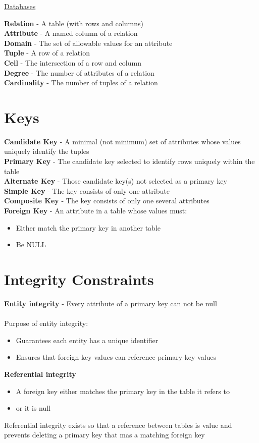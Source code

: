 \documentclass{article}[18pt]
\begin{document}
\begin{center}
\underline{\huge Databases}
\end{center}
\textbf{Relation} - A table (with rows and columns)\\
\textbf{Attribute}  - A named column of a relation\\
\textbf{Domain} - The set of allowable values for an attribute\\
\textbf{Tuple} - A row of a relation\\
\textbf{Cell} - The intersection of a row and column\\
\textbf{Degree} - The number of attributes of a relation\\
\textbf{Cardinality} - The number of tuples of a relation
\section{Keys}
\textbf{Candidate Key} - A minimal (not minimum) set of attributes whose values uniquely identify the tuples\\
\textbf{Primary Key} - The candidate key selected to identify rows uniquely within the table\\
\textbf{Alternate Key} - Those candidate key(s) not selected as a primary key\\
\textbf{Simple Key} - The key consists of only one attribute\\
\textbf{Composite Key} - The key consists of only one several attributes\\
\textbf{Foreign Key} - An attribute in a table whose values must:
\begin{itemize}
	\item Either match the primary key in another table
	\item Be NULL
\end{itemize}
\section{Integrity Constraints}
\textbf{Entity integrity} - Every attribute of a primary key can not be null\\
\\
Purpose of entity integrity:
\begin{itemize}
	\item Guarantees each entity has a unique identifier
	\item Ensures that foreign key values can reference primary key values
\end{itemize}
\textbf{Referential integrity}
\begin{itemize}
	\item A foreign key either matches the primary key in the table it refers to
	\item or it is null
\end{itemize}
Referential integrity exists so that a reference between tables is value and prevents deleting a primary key that mas a matching foreign key
\end{document}
